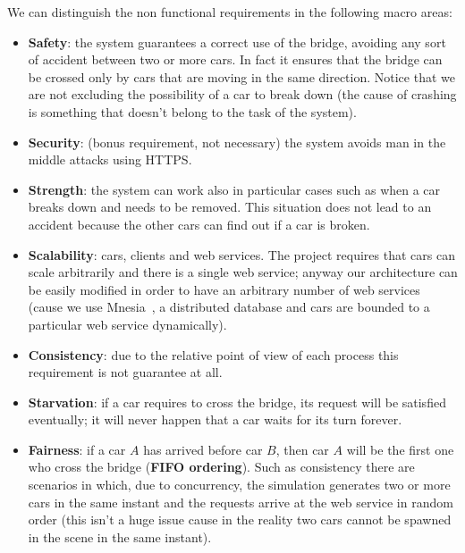 We can distinguish the non functional requirements in the following macro areas:
\begin{itemize}
    \item \textbf{Safety}: the system guarantees a correct use of the bridge, avoiding 
        any sort of accident between two or more cars. 
        In fact it ensures that the bridge can be crossed only by cars that are moving 
        in the same direction. 
        Notice that we are not excluding the possibility of a car to break down 
        (the cause of crashing is something that doesn't belong to the task of the system).
    \item \textbf{Security}: (bonus requirement, not necessary) 
        the system avoids man in the middle attacks using HTTPS.
    \item \textbf{Strength}: the system can work also in particular cases such as 
        when a car breaks down and needs to be removed. 
        This situation does not lead to an accident because the other cars can find out 
        if a car is broken.
    \item \textbf{Scalability}: cars, clients and web services. The project requires that
        cars can scale arbitrarily and there is a single web service; 
        anyway our architecture can be easily modified in order to have an arbitrary number 
        of web services (cause we use Mnesia~\cite{1}, a distributed database and cars are 
        bounded to a particular web service dynamically).
    \item \textbf{Consistency}: due to the relative point of view of each process this 
    requirement is not guarantee at all.
    \item \textbf{Starvation}: if a car requires to cross the bridge, 
        its request will be satisfied eventually; 
    it will never happen that a car waits for its turn forever.
    \item \textbf{Fairness}: if a car $A$ has arrived before car $B$, 
        then car $A$ will be the first one who cross the bridge (\textbf{FIFO ordering}).
        Such as consistency there are scenarios in which, due to concurrency, the simulation 
        generates two or more cars in the same instant and the requests arrive 
        at the web service in random order (this isn't a huge issue cause in the reality 
        two cars cannot be spawned in the scene in the same instant).
\end{itemize}